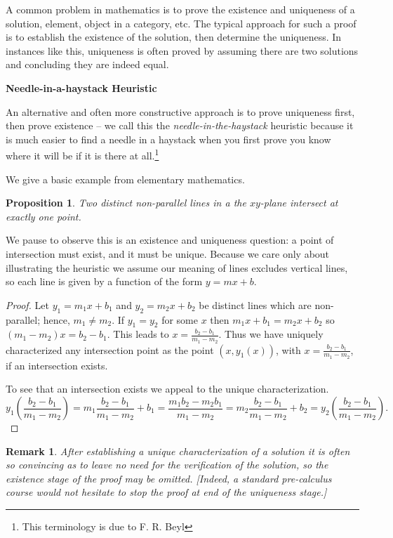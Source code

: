 \documentclass[12pt]{article}
\newtheorem{prop}[thm]{Proposition}
\newtheorem{remark}[thm]{Remark}
\begin{document}
A common problem in mathematics is to prove the existence and uniqueness of a solution, element, object in a category, etc.  The typical approach for such a proof is to establish the existence of the solution, then determine the uniqueness.  In instances like this, uniqueness is often proved by assuming there are two solutions and concluding they are indeed equal.

\textbf{Needle-in-a-haystack Heuristic}

An alternative and often more constructive approach is to prove uniqueness first, then prove existence -- we call this the \emph{needle-in-the-haystack} heuristic because it is much easier to find a needle in a haystack when you first prove you know where it will be if it is there at all.\footnote{This terminology is due to F. R. Beyl}

We give a basic example from elementary mathematics.

\begin{prop}
Two distinct non-parallel lines in a the $xy$-plane intersect at exactly one point.
\end{prop}
We pause to observe this is an existence and uniqueness question: a point of intersection must exist, and it must be unique.  Because we care only about 
illustrating the heuristic we assume our meaning of lines excludes vertical
lines, so each line is given by a function of the form $y=mx+b$.
\begin{proof}
Let $y_1=m_1 x+b_1$ and $y_2=m_2 x+b_2$ be distinct lines which are non-parallel; hence, $m_1\neq m_2$.  If 
$y_1=y_2$ for some $x$ then $m_1 x+b_1=m_2 x+b_2$ so $(m_1-m_2)x=b_2-b_1$.
This leads to $\displaystyle x=\frac{b_2-b_1}{m_1-m_2}$.
Thus we have uniquely characterized any intersection point as the point 
$\displaystyle (x,y_1(x))$, with $\displaystyle x=\frac{b_2-b_1}{m_1-m_2}$,
if an intersection exists.

To see that an intersection exists we appeal to the unique characterization.
\[y_1\left(\frac{b_2-b_1}{m_1-m_2}\right)=m_1\frac{b_2-b_1}{m_1-m_2}+b_1
 =\frac{m_1 b_2-m_2 b_1}{m_1-m_2}
=m_2\frac{b_2-b_1}{m_1-m_2}+b_2
=y_2\left(\frac{b_2-b_1}{m_1-m_2}\right)
.\]
\end{proof}

\begin{remark}
After establishing a unique characterization of a solution it is often so convincing as to leave no need for the verification of the solution, so the existence stage of the proof may be omitted.  [Indeed, a standard pre-calculus course would not hesitate to stop the proof at end of the uniqueness stage.]
\end{remark}
\end{document}
